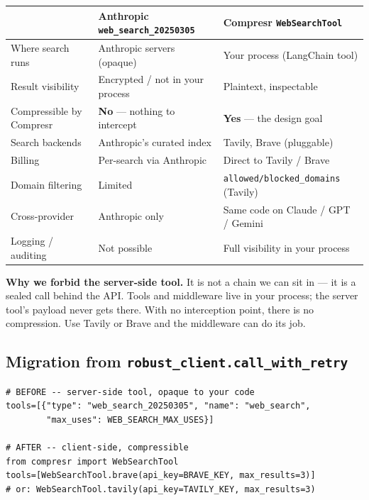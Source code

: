 \documentclass[10pt,a4paper]{article}
\begin{document}
\begin{center}
\renewcommand{\arraystretch}{1.1}
\footnotesize
\begin{tabular}{@{}p{3.6cm}p{5.5cm}p{5.5cm}@{}}
\toprule
& \textbf{Anthropic \texttt{web\_search\_20250305}} & \textbf{Compresr \texttt{WebSearchTool}}\\
\midrule
Where search runs & Anthropic servers (opaque) & Your process (LangChain tool)\\
Result visibility & Encrypted / not in your process & Plaintext, inspectable\\
Compressible by Compresr & \color{cmpred}\textbf{No} --- nothing to intercept & \color{cmpgreen}\textbf{Yes} --- the design goal\\
Search backends & Anthropic's curated index & Tavily, Brave (pluggable)\\
Billing & Per-search via Anthropic & Direct to Tavily / Brave\\
Domain filtering & Limited & \texttt{allowed/blocked\_domains} (Tavily)\\
Cross-provider & Anthropic only & Same code on Claude / GPT / Gemini\\
Logging / auditing & Not possible & Full visibility in your process\\
\bottomrule
\end{tabular}
\end{center}

\noindent\textbf{Why we forbid the server-side tool.} It is not a chain we can sit in --- it is a sealed call behind the API. Tools and middleware live in your process; the server tool's payload never gets there. With no interception point, there is no compression. Use Tavily or Brave and the middleware can do its job.

\subsection{Migration from \texttt{robust\_client.call\_with\_retry}}

\begin{lstlisting}
# BEFORE -- server-side tool, opaque to your code
tools=[{"type": "web_search_20250305", "name": "web_search",
        "max_uses": WEB_SEARCH_MAX_USES}]

# AFTER -- client-side, compressible
from compresr import WebSearchTool
tools=[WebSearchTool.brave(api_key=BRAVE_KEY, max_results=3)]
# or: WebSearchTool.tavily(api_key=TAVILY_KEY, max_results=3)
\end{lstlisting}
\end{document}
